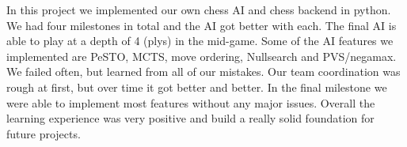 In this project we implemented our own chess AI and chess backend
in python. We had four milestones in total and the AI
got better with each. The final AI is able to play at a depth of 4 (plys)
in the mid-game. Some of the AI features we implemented are PeSTO,
MCTS, move ordering, Nullsearch and PVS/negamax.
We failed often, but learned from all of our mistakes.
Our team coordination was rough at first, but over time
it got better and better. In the final milestone
we were able to implement most features without any major
issues. Overall the learning experience was very positive
and build a really solid foundation for future projects.
